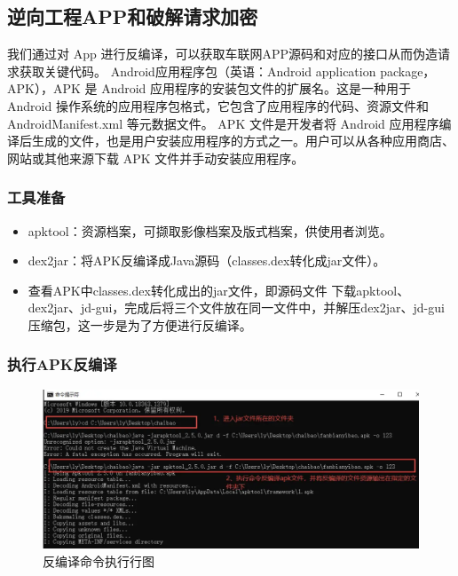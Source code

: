 \subsection{逆向工程APP和破解请求加密}
我们通过对 App 进行反编译\cite{yang2015automated}，可以获取车联网APP源码和对应的接口从而伪造请求获取关键代码。
Android应用程序包（英语：Android application package，APK），APK 是 Android 应用程序的安装包文件的扩展名。这是一种用于 Android 操作系统的应用程序包格式，它包含了应用程序的代码、资源文件和 AndroidManifest.xml 等元数据文件。
APK 文件是开发者将 Android 应用程序编译后生成的文件，也是用户安装应用程序的方式之一。用户可以从各种应用商店、网站或其他来源下载 APK 文件并手动安装应用程序。

\subsubsection{工具准备}
\begin{itemize}
    \item apktool：资源档案，可撷取影像档案及版式档案，供使用者浏览。        
    \item dex2jar：将APK反编译成Java源码（classes.dex转化成jar文件）。
    \item 查看APK中classes.dex转化成出的jar文件，即源码文件 下载apktool、dex2jar、jd-gui，完成后将三个文件放在同一文件中，并解压dex2jar、jd-gui压缩包，这一步是为了方便进行反编译。
\end{itemize}

\subsubsection{执行APK反编译}
\begin{figure}
    \centering
    \includegraphics[scale=0.5]{resources/img/i19.png}
    \caption{反编译命令执行行图}
  \end{figure}

